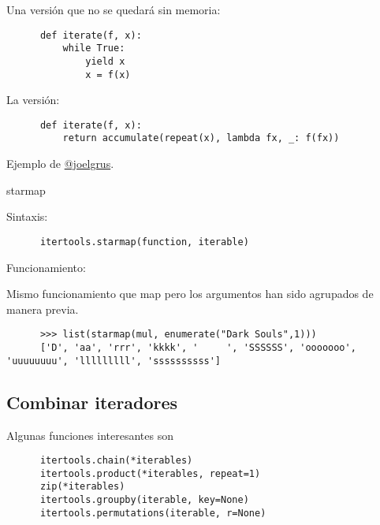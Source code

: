 \documentclass[spanish]{beamer}
\begin{document}
  \begin{frame}[fragile]

    Una versión que no se quedará sin memoria:

    \begin{lstlisting}
      def iterate(f, x):
          while True:
              yield x
              x = f(x)
    \end{lstlisting}
    
  \end{frame}

  \begin{frame}[fragile]

    La versión:
    
    \begin{lstlisting}
      def iterate(f, x):
          return accumulate(repeat(x), lambda fx, _: f(fx))
    \end{lstlisting}

    Ejemplo de \href{https://github.com/joelgrus/stupid-itertools-tricks-pydata}{@joelgrus}.
    
  \end{frame}

  \begin{frame}[fragile]{starmap}

    Sintaxis:

    \begin{lstlisting}
      itertools.starmap(function, iterable)
    \end{lstlisting}

    Funcionamiento:

    Mismo funcionamiento que map pero los argumentos han sido agrupados de manera previa.
    
    
    \begin{lstlisting}
      >>> list(starmap(mul, enumerate("Dark Souls",1)))
      ['D', 'aa', 'rrr', 'kkkk', '     ', 'SSSSSS', 'ooooooo', 'uuuuuuuu', 'lllllllll', 'ssssssssss']
    \end{lstlisting}

    
  \end{frame}

  \subsection{Combinar iteradores}
  \begin{frame}[fragile]{Algunas funciones interesantes son}

    \begin{lstlisting}
      itertools.chain(*iterables)
      itertools.product(*iterables, repeat=1)
      zip(*iterables)
      itertools.groupby(iterable, key=None)
      itertools.permutations(iterable, r=None)
    \end{lstlisting}
    
  \end{frame}
\end{document}
